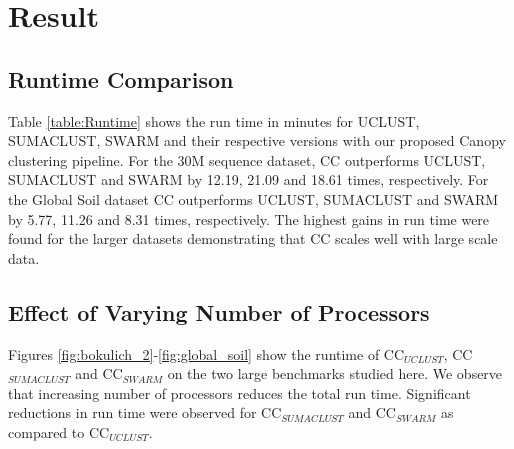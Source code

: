 \documentclass[letterpaper,twocolumn]{article}
\begin{document}
\section{Result}
\label{sec:Results}
\subsection{Runtime Comparison} Table \ref{table:Runtime} shows the run time in minutes for 
UCLUST, SUMACLUST, SWARM and their respective versions with our proposed Canopy clustering pipeline. For the 30M sequence dataset, 
CC outperforms UCLUST, SUMACLUST and SWARM by 12.19, 21.09 and 18.61 times, respectively. For the Global Soil dataset 
CC outperforms UCLUST, SUMACLUST and SWARM by 5.77, 11.26 and 8.31 times, 
respectively. The highest gains in run time were found for the 
larger datasets demonstrating that 
CC scales well with large scale data. 

\subsection{Effect of Varying Number of Processors}
Figures \ref{fig:bokulich_2}-\ref{fig:global_soil} show the 
runtime of CC$_{UCLUST}$, CC$_{SUMACLUST}$ and CC$_{SWARM}$ on the 
two large 
benchmarks studied here. We observe that 
increasing number of processors reduces the 
total run time. Significant reductions in run time were 
observed for CC$_{SUMACLUST}$ and CC$_{SWARM}$ as 
compared to CC$_{UCLUST}$.  
\end{document}
